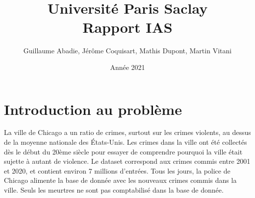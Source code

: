 \documentclass{article}
\title{\textbf{\Huge  Université Paris Saclay}\\ Rapport IAS}
\author{Guillaume Abadie, Jérôme Coquisart, Mathis Dupont, Martin Vitani}
\date{Année 2021}
\begin{document}
    \maketitle
    \vspace{100px}
    \tableofcontents
    \newpage

    \section{Introduction au problème}
    La ville de Chicago a un ratio de crimes, surtout sur les crimes violents,
    au dessus de la moyenne nationale des États-Unis.
    Les crimes dans la ville ont été collectés dès le début du 20ème siècle pour
    essayer de comprendre pourquoi la ville était sujette à autant de violence.
    Le dataset correspond aux crimes commis entre 2001 et 2020, et contient environ 
    7 millions d'entrées.
    Tous les jours, la police de Chicago alimente la base de donnée avec les
    nouveaux crimes commis dans la ville. 
    Seuls les meurtres ne sont pas comptabilisé dans la base de donnée.
\end{document}
